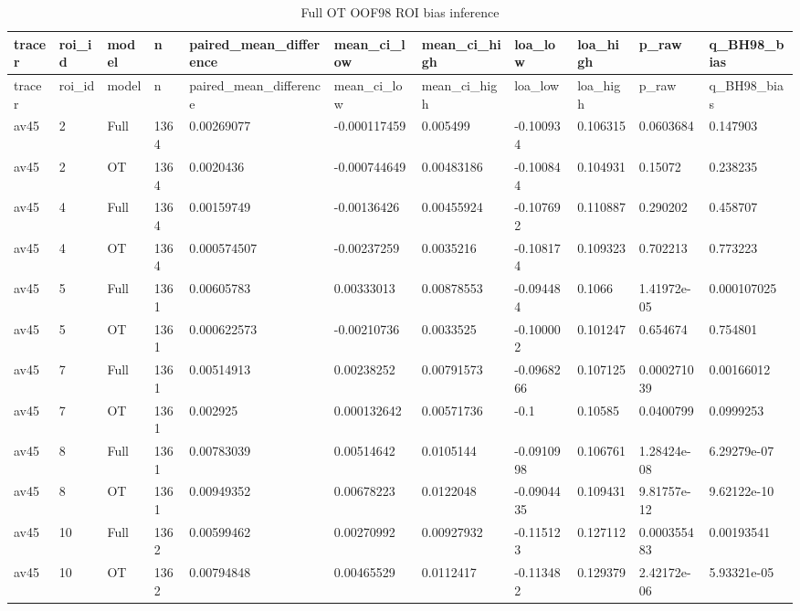 \begin{landscape}
\begingroup
\footnotesize
\setlength{\tabcolsep}{4pt}
\begin{longtable}{lllllllllll}
\caption{Full OT OOF98 ROI bias inference}\label{tab:s-n12}\\
\toprule
tracer & roi\_id & model & n & paired\_mean\_difference & mean\_ci\_low & mean\_ci\_high & loa\_low & loa\_high & p\_raw & q\_BH98\_bias \\
\midrule
\endfirsthead
\toprule
tracer & roi\_id & model & n & paired\_mean\_difference & mean\_ci\_low & mean\_ci\_high & loa\_low & loa\_high & p\_raw & q\_BH98\_bias \\
\midrule
\endhead
\bottomrule
\endfoot
av45 & 2 & Full & 1364 & 0.00269077 & -0.000117459 & 0.005499 & -0.100934 & 0.106315 & 0.0603684 & 0.147903 \\
av45 & 2 & OT & 1364 & 0.0020436 & -0.000744649 & 0.00483186 & -0.100844 & 0.104931 & 0.15072 & 0.238235 \\
av45 & 4 & Full & 1364 & 0.00159749 & -0.00136426 & 0.00455924 & -0.107692 & 0.110887 & 0.290202 & 0.458707 \\
av45 & 4 & OT & 1364 & 0.000574507 & -0.00237259 & 0.0035216 & -0.108174 & 0.109323 & 0.702213 & 0.773223 \\
av45 & 5 & Full & 1361 & 0.00605783 & 0.00333013 & 0.00878553 & -0.094484 & 0.1066 & 1.41972e-05 & 0.000107025 \\
av45 & 5 & OT & 1361 & 0.000622573 & -0.00210736 & 0.0033525 & -0.100002 & 0.101247 & 0.654674 & 0.754801 \\
av45 & 7 & Full & 1361 & 0.00514913 & 0.00238252 & 0.00791573 & -0.0968266 & 0.107125 & 0.000271039 & 0.00166012 \\
av45 & 7 & OT & 1361 & 0.002925 & 0.000132642 & 0.00571736 & -0.1 & 0.10585 & 0.0400799 & 0.0999253 \\
av45 & 8 & Full & 1361 & 0.00783039 & 0.00514642 & 0.0105144 & -0.0910998 & 0.106761 & 1.28424e-08 & 6.29279e-07 \\
av45 & 8 & OT & 1361 & 0.00949352 & 0.00678223 & 0.0122048 & -0.0904435 & 0.109431 & 9.81757e-12 & 9.62122e-10 \\
av45 & 10 & Full & 1362 & 0.00599462 & 0.00270992 & 0.00927932 & -0.115123 & 0.127112 & 0.000355483 & 0.00193541 \\
av45 & 10 & OT & 1362 & 0.00794848 & 0.00465529 & 0.0112417 & -0.113482 & 0.129379 & 2.42172e-06 & 5.93321e-05 \\

\end{longtable}
\end{landscape}
